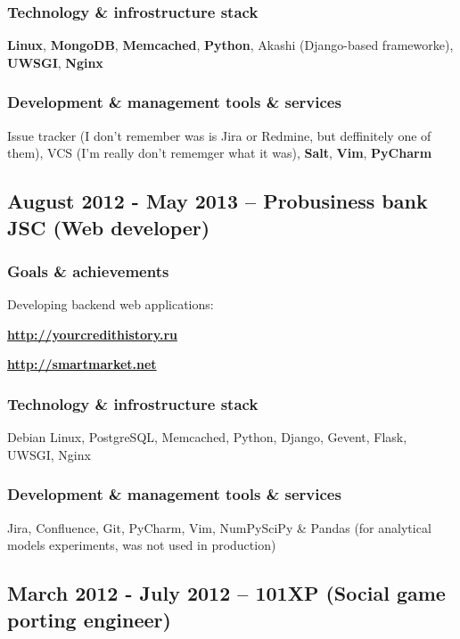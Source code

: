 \documentclass[9pt, a4paper, english]{extarticle}
\begin{document}
    \subsubsection* {Technology \& infrostructure stack}
      \textbf{Linux}, \textbf{MongoDB}, \textbf{Memcached}, \textbf{Python}, Akashi (Django-based frameworke),
      \textbf{UWSGI}, \textbf{Nginx}
    \subsubsection* {Development \& management tools \& services}
      Issue tracker (I don't remember was is Jira or Redmine, but deffinitely one of them), VCS (I'm really
      don't rememger what it was), \textbf{Salt}, \textbf{Vim}, \textbf{PyCharm}

  \subsection* {August 2012 - May 2013 -- \textbf{Probusiness bank JSC} (Web developer)}
    \subsubsection* {Goals \& achievements}
      Developing backend web applications:
      \begin {list}{\textbullet}{\itemsep=0mm}
        \item \textbf{\url{http://yourcredithistory.ru}}
        \item \textbf{\url{http://smartmarket.net}}
      \end {list}
    \subsubsection* {Technology \& infrostructure stack}
      Debian Linux, PostgreSQL, Memcached, Python, Django, Gevent, Flask,
      UWSGI, Nginx
    \subsubsection* {Development \& management tools \& services}
      Jira, Confluence, Git, PyCharm, Vim, NumPy\/SciPy \& Pandas (for
      analytical models experiments, was not used in production)


  \subsection* {March 2012 - July 2012 -- \textbf{101XP} (Social game porting engineer)}
\end{document}

